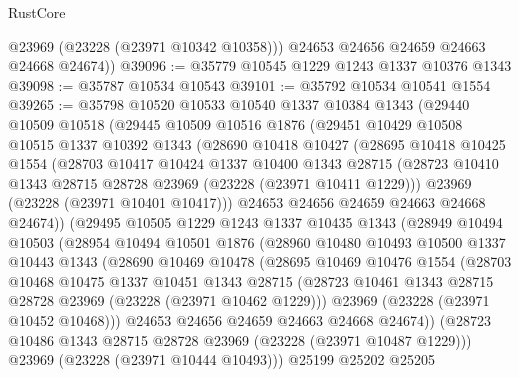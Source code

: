 \begin{lexlean}{RustCore}
\begin{coremodule}
          @23969
          (@23228 (@23971 @10342 @10358)))
        @24653
        @24656
        @24659
        @24663
        @24668
        @24674))
@39096 := @35779 @10545 @1229 @1243 @1337 @10376 @1343
@39098 := @35787 @10534 @10543
@39101 := @35792 @10534 @10541 @1554
@39265 := @35798
    @10520
    @10533
    @10540
    @1337
    @10384
    @1343
    (@29440
      @10509
      @10518
      (@29445
        @10509
        @10516
        @1876
        (@29451
          @10429
          @10508
          @10515
          @1337
          @10392
          @1343
          (@28690
            @10418
            @10427
            (@28695
              @10418
              @10425
              @1554
              (@28703
                @10417
                @10424
                @1337
                @10400
                @1343
                @28715
                (@28723 @10410 @1343 @28715 @28728 @23969 (@23228 (@23971 @10411 @1229)))
                @23969
                (@23228 (@23971 @10401 @10417)))
              @24653
              @24656
              @24659
              @24663
              @24668
              @24674))
          (@29495
            @10505
            @1229
            @1243
            @1337
            @10435
            @1343
            (@28949
              @10494
              @10503
              (@28954
                @10494
                @10501
                @1876
                (@28960
                  @10480
                  @10493
                  @10500
                  @1337
                  @10443
                  @1343
                  (@28690
                    @10469
                    @10478
                    (@28695
                      @10469
                      @10476
                      @1554
                      (@28703
                        @10468
                        @10475
                        @1337
                        @10451
                        @1343
                        @28715
                        (@28723 @10461 @1343 @28715 @28728 @23969 (@23228 (@23971 @10462 @1229)))
                        @23969
                        (@23228 (@23971 @10452 @10468)))
                      @24653
                      @24656
                      @24659
                      @24663
                      @24668
                      @24674))
                  (@28723 @10486 @1343 @28715 @28728 @23969 (@23228 (@23971 @10487 @1229)))
                  @23969
                  (@23228 (@23971 @10444 @10493)))
                @25199
                @25202
                @25205

\end{coremodule}
\end{lexlean}
